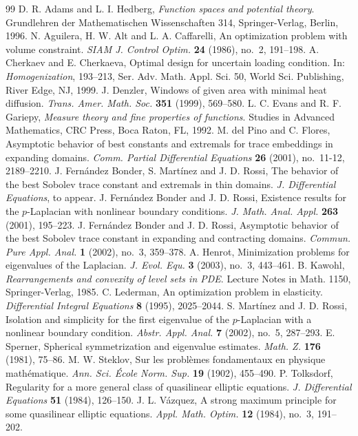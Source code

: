 \documentclass[11pt]{amsart}
\theoremstyle{remark}
\numberwithin{equation}{section}
\begin{document}
\begin{thebibliography}{99}
 D. R. Adams and L. I. Hedberg, \emph{Function spaces and potential theory}. Grundlehren der Mathematischen Wissenschaften 314, Springer-Verlag, Berlin, 1996.
 N. Aguilera, H. W. Alt and L. A. Caffarelli, An optimization problem with volume constraint. \emph{SIAM J. Control Optim.} \textbf{24} (1986), no.~2, 191--198.
 A. Cherkaev and E. Cherkaeva, Optimal design for uncertain loading condition. In: \emph{Homogenization}, 193--213, Ser. Adv. Math. Appl. Sci. 50, World Sci. Publishing, River Edge, NJ, 1999.
 J. Denzler, Windows of given area with minimal heat diffusion. \emph{Trans. Amer. Math. Soc.} \textbf{351} (1999), 569--580.
 L. C. Evans and R. F. Gariepy, \emph{Measure theory and fine properties of functions}. Studies in Advanced Mathematics, CRC Press, Boca Raton, FL, 1992.
 M. del Pino and C. Flores, Asymptotic behavior of best constants and extremals for trace embeddings in expanding domains. \emph{Comm. Partial Differential Equations} \textbf{26} (2001), no.~11-12, 2189--2210.
 J. Fernández Bonder, S. Martínez and J. D. Rossi, The behavior of the best Sobolev trace constant and extremals in thin domains. \emph{J. Differential Equations}, to appear.
 J. Fernández Bonder and J. D. Rossi, Existence results for the $p$-Laplacian with nonlinear boundary conditions. \emph{J. Math. Anal. Appl.} \textbf{263} (2001), 195--223.
 J. Fernández Bonder and J. D. Rossi, Asymptotic behavior of the best Sobolev trace constant in expanding and contracting domains. \emph{Commun. Pure Appl. Anal.} \textbf{1} (2002), no.~3, 359--378.
 A. Henrot, Minimization problems for eigenvalues of the Laplacian. \emph{J. Evol. Equ.} \textbf{3} (2003), no.~3, 443--461.
 B. Kawohl, \emph{Rearrangements and convexity of level sets in PDE}. Lecture Notes in Math. 1150, Springer-Verlag, 1985.
 C. Lederman, An optimization problem in elasticity. \emph{Differential Integral Equations} \textbf{8} (1995), 2025--2044.
 S. Martínez and J. D. Rossi, Isolation and simplicity for the first eigenvalue of the $p$-Laplacian with a nonlinear boundary condition. \emph{Abstr. Appl. Anal.} \textbf{7} (2002), no.~5, 287--293.
 E. Sperner, Spherical symmetrization and eigenvalue estimates. \emph{Math. Z.} \textbf{176} (1981), 75--86.
 M. W. Steklov, Sur les problèmes fondamentaux en physique mathématique. \emph{Ann. Sci. École Norm. Sup.} \textbf{19} (1902), 455--490.
 P. Tolksdorf, Regularity for a more general class of quasilinear elliptic equations. \emph{J. Differential Equations} \textbf{51} (1984), 126--150.
 J. L. Vázquez, A strong maximum principle for some quasilinear elliptic equations. \emph{Appl. Math. Optim.} \textbf{12} (1984), no.~3, 191--202.
\end{thebibliography}
\end{document}
